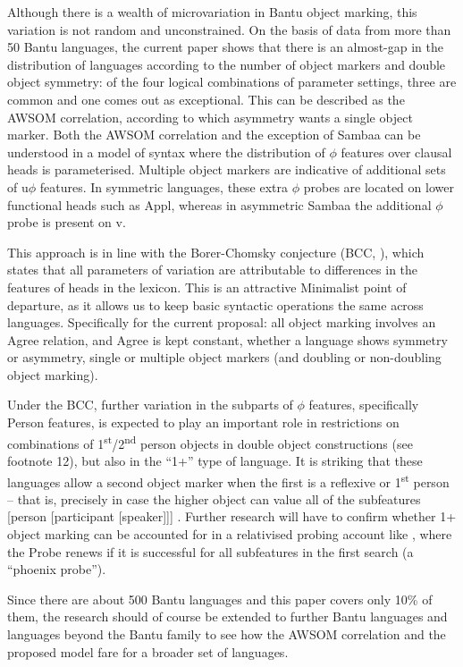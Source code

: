 \documentclass[output=paper
,modfonts
,nonflat]{langsci/langscibook}
\begin{document}
Although there is a wealth of microvariation in Bantu object marking, this variation is not random and unconstrained. On the basis of data from more than 50 Bantu languages, the current paper shows that there is an almost-gap in the distribution of languages according to the number of object markers and double object symmetry: of the four logical combinations of parameter settings, three are common and one comes out as exceptional. This can be described as the AWSOM correlation, according to which asymmetry wants a single object marker. Both the AWSOM correlation and the exception of Sambaa can be understood in a model of syntax where the distribution of $\phi$ features over clausal heads is parameterised. Multiple object markers are indicative of additional sets of u$\phi$ features. In symmetric languages, these extra $\phi$ probes are located on lower functional heads such as Appl, whereas in asymmetric Sambaa the additional $\phi$ probe is present on v. 

This approach is in line with the Borer-Chomsky conjecture (BCC, \citealt{Borer1984,Chomsky1995,Baker2008b,Baker2008a}), which states that all parameters of variation are attributable to differences in the features of heads in the lexicon. This is an attractive Minimalist point of departure, as it allows us to keep basic syntactic operations the same across languages. Specifically for the current proposal: all object marking involves an Agree relation, and Agree is kept constant, whether a language shows symmetry or asymmetry, single or multiple object markers (and doubling or non-doubling object marking).

Under the BCC, further variation in the subparts of $\phi$ features, specifically Person features, is expected to play an important role in restrictions on combinations of 1\textsuperscript{st}/2\textsuperscript{nd} person objects in double object constructions (see footnote 12), but also in the “1+” type of language. It is striking that these languages allow a second object marker when the first is a reflexive or 1\textsuperscript{st} person -- that is, precisely in case the higher object can value all of the subfeatures [person [participant [speaker]]] \citep{Bejar_Rezac2009}. Further research will have to confirm whether 1+ object marking can be accounted for in a relativised probing account like \citet{Bejar_Rezac2009}, where the Probe renews if it is successful for all subfeatures in the first search (a “phoenix probe”).

Since there are about 500 Bantu languages and this paper covers only 10\% of them, the research should of course be extended to further Bantu languages and languages beyond the Bantu family to see how the AWSOM correlation and the proposed model fare for a broader set of languages.
\end{document}
